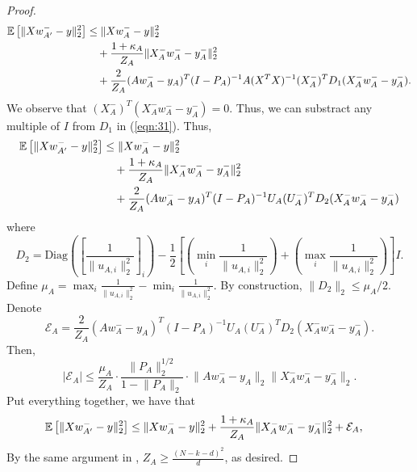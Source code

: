 \begin{proof}
    \begin{align}
        \mathbb{E}\left[ \lVert Xw^-_{A'} - y \rVert_2^2 \right] & \leq \lVert Xw_{A}^- - y \rVert_2^2 \nonumber \\
        & \quad + {1 + \kappa_A\over Z_A} \lVert X_A^- w_A^- - y_A^- \rVert_2^2 \nonumber \\
        & \quad + {2\over Z_A}  (Aw_A^- - y_A)^T (I - P_A)^{-1} A (X^T X)^{-1} (X_A^-)^T D_1 (X_A^- w_A^- - y_A^-) \label{eqn:31}.
    \end{align}
    We observe that $(X_A^-)^T (X_A^- w_A^- - y_A^-) = 0$. Thus, we can substract any multiple of $I$ from $D_1$ in (\ref{eqn:31}). Thus, 
    \begin{align}
        \mathbb{E}\left[ \lVert Xw^-_{A'} - y \rVert_2^2 \right] & \leq \lVert Xw_{A}^- - y \rVert_2^2 \nonumber \\
        & \quad + {1 + \kappa_A\over Z_A} \lVert X_A^- w_A^- - y_A^- \rVert_2^2 \nonumber \\
        & \quad + {2\over Z_A}  (Aw_A^- - y_A)^T (I - P_A)^{-1} U_A (U_A^-)^T D_2 (X_A^- w_A^- - y_A^-) \label{eqn:32}
    \end{align}
    where
    \begin{equation}
        D_2 = \mathrm{Diag} \left( \left[ \frac{1}{\lVert u_{A, i} \rVert_2^2} \right]_{i} \right) - \frac{1}{2} \left[ \left(\min_i \frac{1}{\lVert u_{A, i} \rVert_2^2} \right) +  \left( \max_i \frac{1}{\lVert u_{A, i} \rVert_2^2} \right) \right] I.
    \end{equation}
    Define $\mu_A =  \max_i \frac{1}{\lVert u_{A, i} \rVert_2^2} - \min_i \frac{1}{\lVert u_{A, i} \rVert_2^2}$. By construction, $\lVert D_2 \rVert_2 \leq \mu_A / 2$. Denote
    \begin{equation}
        \mathcal{E}_A = \frac{2}{Z_A}  (Aw_A^- - y_A)^T (I - P_A)^{-1} U_A (U_A^-)^T D_2 (X_A^- w_A^- - y_A^-).
    \end{equation}
    Then,
    \begin{equation}
        | \mathcal{E}_A | \leq \frac{\mu_A}{Z_A} \cdot  \frac{\lVert P_A \rVert_2^{1/2}}{1 - \lVert P_A \rVert_2} \cdot \lVert Aw_A^- - y_A \rVert_2   \lVert X_A^- w_A^- - y_A^- \rVert_2.   
    \end{equation}
    Put everything together, we have that
   \begin{align}
        \mathbb{E}\left[ \lVert Xw^-_{A'} - y \rVert_2^2 \right] & \leq \lVert Xw_{A}^- - y \rVert_2^2 + {1 + \kappa_A\over  Z_A } \lVert X_A^- w_A^- - y_A^- \rVert_2^2 + \mathcal{E}_A, 
    \end{align} 
    By the same argument in \cite[Theorem 1]{gittens2023}, $Z_A \geq \frac{(N - k - d)^2}{d}$, as desired.
\end{proof}

